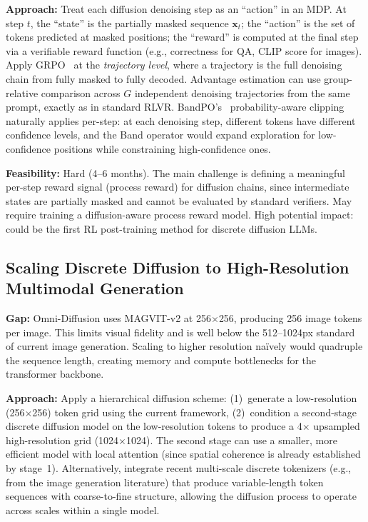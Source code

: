 \documentclass[11pt]{article}
\begin{document}
\textbf{Approach:} Treat each diffusion denoising step as an ``action'' in an MDP. At step $t$, the ``state'' is the partially masked sequence $\mathbf{x}_t$; the ``action'' is the set of tokens predicted at masked positions; the ``reward'' is computed at the final step via a verifiable reward function (e.g., correctness for QA, CLIP score for images). Apply GRPO~\citep{shao2024deepseekmath} at the \emph{trajectory level}, where a trajectory is the full denoising chain from fully masked to fully decoded. Advantage estimation can use group-relative comparison across $G$ independent denoising trajectories from the same prompt, exactly as in standard RLVR. BandPO's~\citep{li2026bandpo} probability-aware clipping naturally applies per-step: at each denoising step, different tokens have different confidence levels, and the Band operator would expand exploration for low-confidence positions while constraining high-confidence ones.

\textbf{Feasibility:} Hard (4--6 months). The main challenge is defining a meaningful per-step reward signal (process reward) for diffusion chains, since intermediate states are partially masked and cannot be evaluated by standard verifiers. May require training a diffusion-aware process reward model. High potential impact: could be the first RL post-training method for discrete diffusion LLMs.

\subsection{Scaling Discrete Diffusion to High-Resolution Multimodal Generation}

\textbf{Gap:} Omni-Diffusion uses MAGVIT-v2 at 256$\times$256, producing 256 image tokens per image. This limits visual fidelity and is well below the 512--1024px standard of current image generation. Scaling to higher resolution na\"ively would quadruple the sequence length, creating memory and compute bottlenecks for the transformer backbone.

\textbf{Approach:} Apply a hierarchical diffusion scheme: (1)~generate a low-resolution (256$\times$256) token grid using the current framework, (2)~condition a second-stage discrete diffusion model on the low-resolution tokens to produce a 4$\times$ upsampled high-resolution grid (1024$\times$1024). The second stage can use a smaller, more efficient model with local attention (since spatial coherence is already established by stage~1). Alternatively, integrate recent multi-scale discrete tokenizers (e.g., from the image generation literature) that produce variable-length token sequences with coarse-to-fine structure, allowing the diffusion process to operate across scales within a single model.
\end{document}
